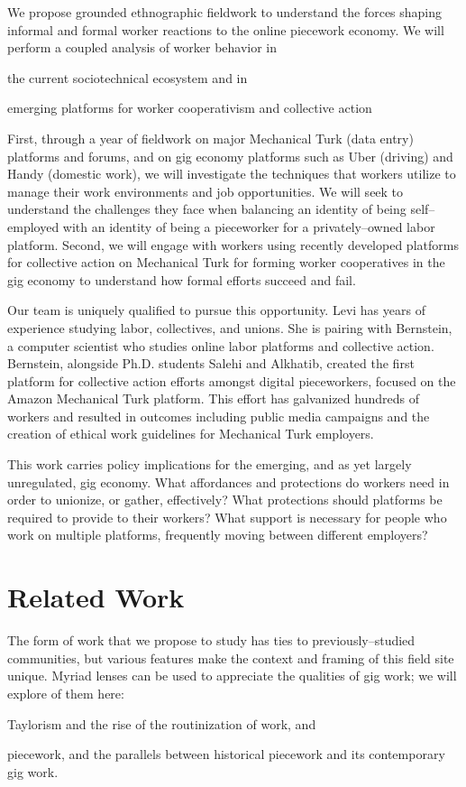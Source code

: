 \documentclass[11pt]{article}
\makeatletter
\newcounter{countitems}
\newcounter{nextitemizecount}
\newcommand{\nextitemizecount}{%
  \getrefnumber{countitems@\number\c@nextitemizecount}%
}
\makeatother
\begin{document}
We propose grounded ethnographic fieldwork to understand the forces shaping informal and formal worker reactions to the online piecework economy.
We will perform a coupled analysis of worker behavior in
\begin{inlinelist}
  \item the current sociotechnical ecosystem and in 
  \item emerging platforms for worker cooperativism and collective action
\end{inlinelist}
First, through a year of fieldwork on
  major Mechanical Turk (data entry) platforms and forums, and
  on gig economy platforms such as Uber (driving) and
  Handy (domestic work),
we will investigate the techniques that workers utilize
to manage their work environments and job opportunities.
We will seek to understand the challenges they face when
balancing an identity of being self--employed with
          an identity of being a pieceworker for a privately--owned labor platform.
Second, we will engage with workers using
recently developed platforms for collective action on Mechanical Turk
for forming worker cooperatives in the gig economy
to understand how formal efforts succeed and fail.

Our team is uniquely qualified to pursue this opportunity.
Levi has years of experience studying
  labor,
  collectives, and
  unions.
She is pairing with Bernstein,
a computer scientist who studies online labor platforms and collective action.
Bernstein, alongside Ph.D.
students Salehi and Alkhatib,
created the first platform for collective action efforts amongst digital pieceworkers,
focused on the Amazon Mechanical Turk platform.
This effort has galvanized hundreds of workers and
resulted in outcomes including public media campaigns and
the creation of ethical work guidelines for Mechanical Turk employers.

This work carries policy implications for the emerging,
and as yet largely unregulated, gig economy.
What affordances and protections do workers need in order to unionize,
or gather, effectively?
What protections should platforms be required to provide to their workers?
What support is necessary for people who work on multiple platforms,
frequently moving between different employers?


\section{Related Work}


The form of work that we propose to study has ties to previously--studied communities,
but various features make the context and framing of this field site unique.
Myriad lenses can be used to appreciate the qualities of gig work; we will explore
\nextitemizecount{}
of them here:
\begin{inlinelist}
  \item Taylorism and the rise of the routinization of work, and
  \item piecework, and the parallels between historical piecework and its contemporary gig work.
\end{inlinelist}
\end{document}
